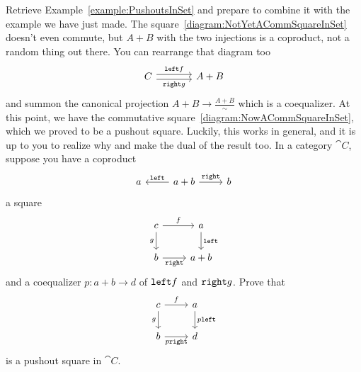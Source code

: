 \begin{exercise}
Retrieve Example~\ref{example:PushoutsInSet} and prepare to combine it with the example we have just made. The square~\eqref{diagram:NotYetACommSquareInSet} doesn't even commute, but \(A+B\) with the two injections is a coproduct, not a random thing out there. You can rearrange that diagram too
\[\begin{tikzcd}[column sep=large]
C \ar["{\linj f}",r, shift left] \ar["{\rinj g}", r, shift right, swap] & A+B
\end{tikzcd}\]
and summon the canonical projection \(A+B \to \frac{A+B}{\sim}\) which is a coequalizer. At this point, we have the commutative square~\eqref{diagram:NowACommSquareInSet}, which we proved to be a pushout square. Luckily, this works in general, and it is up to you to realize why and make the dual of the result too.\newline
In a category \(\cat C\), suppose you have a coproduct 
\[\begin{tikzcd}a & a+b \ar["{\linj}", l, swap] \ar["{\rinj}", r] & b\end{tikzcd}\]
a square
\[\begin{tikzcd}
c \ar["f", r] \ar["g", d, swap]  & a \ar["\linj", d] \\
b \ar["\rinj", r, swap] & a+b
\end{tikzcd}\]
and a coequalizer \(p : a+b \to d\) of \(\mathtt{left} f\) and \(\mathtt{right} g\). Prove that
\[\begin{tikzcd}
c \ar["f", r] \ar["g", d, swap]  & a \ar["p\linj", d] \\
b \ar["p\rinj", r, swap] & d
\end{tikzcd}\]
is a pushout square in \(\cat C\).%
\end{exercise}



